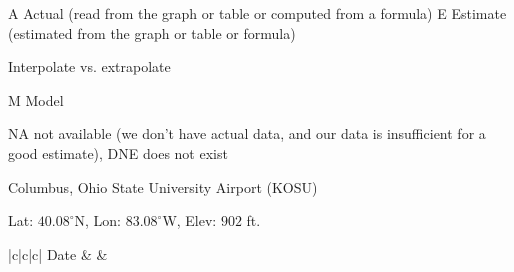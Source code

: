 \documentclass[nooutcomes]{ximera}
\begin{document}
\begin{problem}


A Actual (read from the graph or table or computed from a formula)
E Estimate (estimated from the graph or table or formula)

Interpolate vs. extrapolate 

M Model

NA not available (we don't have actual data, and our data is insufficient for a good estimate), 
DNE does not exist 



Columbus, Ohio State University Airport (KOSU)

Lat: $40.08^\circ$N, Lon: $83.08^\circ$W, Elev: $902$ ft.

\begin{tabular}{|c|c|c|}
\hline
Date  &     
      &    \\ \hline

\end{tabular}
\end{problem}
\end{document}
